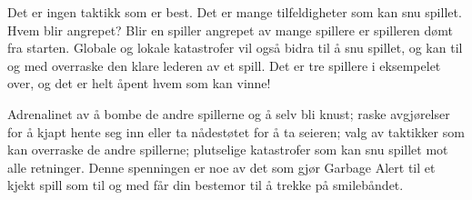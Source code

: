 Det er ingen taktikk som er best. Det er mange tilfeldigheter som kan snu spillet. Hvem blir angrepet? Blir en spiller angrepet av mange spillere er spilleren dømt fra starten. Globale og lokale katastrofer vil også bidra til å snu spillet, og kan til og med overraske den klare lederen av et spill. Det er tre spillere i eksempelet over, og det er helt åpent hvem som kan vinne!

Adrenalinet av å bombe de andre spillerne og å selv bli knust; raske avgjørelser for å kjapt hente seg inn eller ta nådestøtet for å ta seieren; valg av taktikker som kan overraske de andre spillerne; plutselige katastrofer som kan snu spillet mot alle retninger. Denne spenningen er noe av det som gjør Garbage Alert til et kjekt spill som til og med får din bestemor til å trekke på smilebåndet.




